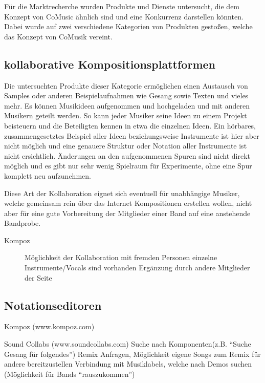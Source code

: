 \documentclass[12pt]{scrartcl}
\begin{document}
Für die Marktrecherche wurden Produkte und Dienste untersucht, die dem Konzept von CoMusic ähnlich sind und eine Konkurrenz darstellen könnten. Dabei wurde auf zwei verschiedene Kategorien von Produkten gestoßen, welche das Konzept von CoMusik vereint.

\subsection{kollaborative Kompositionsplattformen}

Die untersuchten Produkte dieser Kategorie ermöglichen einen Austausch von Samples oder anderen Beispielaufnahmen wie Gesang sowie Texten und vieles mehr. Es können Musikideen aufgenommen und hochgeladen und mit anderen Musikern geteilt werden. So kann jeder Musiker seine Ideen zu einem Projekt beisteuern und die Beteiligten kennen in etwa die einzelnen Ideen. Ein hörbares, zusammengesetztes Beispiel aller Ideen beziehungsweise Instrumente ist hier aber nicht möglich und eine genauere Struktur oder Notation aller Instrumente ist nicht ersichtlich. Änderungen an den aufgenommenen Spuren sind nicht direkt möglich und es gibt nur sehr wenig Spielraum für Experimente, ohne eine Spur komplett neu aufzunehmen.

Diese Art der Kollaboration eignet sich eventuell für unabhängige Musiker, welche gemeinsam rein über das Internet Kompositionen erstellen wollen, nicht aber für eine gute Vorbereitung der Mitglieder einer Band auf eine anstehende Bandprobe.

\begin{description}
\item[Kompoz]
Möglichkeit der Kollaboration mit fremden Personen
einzelne Instrumente/Vocals sind vorhanden
Ergänzung durch andere Mitglieder der Seite 

\end{description}


\subsection{Notationseditoren}






Kompoz (www.kompoz.com)


Sound Collabs (www.soundcollabs.com)
Suche nach Komponenten(z.B. “Suche Gesang für folgendes”)
Remix Anfragen, Möglichkeit eigene Songs zum Remix für andere bereitzustellen
Verbindung mit Musiklabels, welche nach Demos suchen (Möglichkeit für Bands “rauszukommen”)
\end{document}

